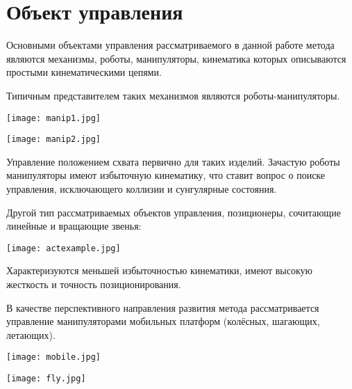 \section{Объект управления}

Основными объектами управления рассматриваемого в данной работе метода являются механизмы, роботы, манипуляторы, кинематика которых описываются простыми кинематическими цепями.

Типичным представителем таких механизмов являются роботы-манипуляторы.

\begin{center}
  \texttt{[image: manip1.jpg]}
  \label{}
\end{center}

\begin{center}
  \texttt{[image: manip2.jpg]}
  \label{}
\end{center}

Управление положением схвата первично для таких изделий. Зачастую роботы манипуляторы имеют избыточную кинематику, что ставит вопрос о поиске управления, исключающего коллизии и сунгулярные состояния.

Другой тип рассматриваемых объектов управления, позиционеры, сочитающие линейные и вращающие звенья:

\begin{center}
  \texttt{[image: actexample.jpg]}
  \label{}
\end{center}

Характеризуются меньшей избыточностью кинематики, имеют высокую жесткость и точность позиционирования.

В качестве перспективного направления развития метода рассматривается управление манипуляторами мобильных платформ (колёсных, шагающих, летающих).

\begin{center}
  \texttt{[image: mobile.jpg]}
  \label{}
\end{center}

\begin{center}
  \texttt{[image: fly.jpg]}
  \label{}
\end{center}

